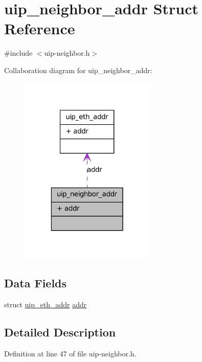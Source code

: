 \hypertarget{structuip__neighbor__addr}{
\section{uip\_\-neighbor\_\-addr Struct Reference}
\label{structuip__neighbor__addr}
}


{\ttfamily \#include $<$uip-\/neighbor.h$>$}



Collaboration diagram for uip\_\-neighbor\_\-addr:
\nopagebreak
\begin{figure}[H]
\begin{center}
\leavevmode
\includegraphics[width=184pt]{structuip__neighbor__addr__coll__graph}
\end{center}
\end{figure}
\subsection*{Data Fields}
\begin{DoxyCompactItemize}
\item 
struct \hyperlink{structuip__eth__addr}{uip\_\-eth\_\-addr} \hyperlink{structuip__neighbor__addr_a4dc3294d67d705f7248ef57e4259424f}{addr}
\end{DoxyCompactItemize}


\subsection{Detailed Description}


Definition at line 47 of file uip-\/neighbor.h.



